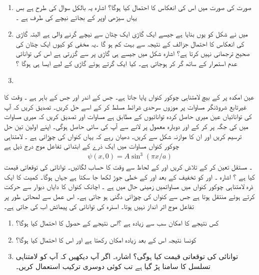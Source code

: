 \begin{enumerate}
\item  صورت   کی صورت میں اس کی انعکاس کا احتمال کیا ہوگا؟
 اشارہ یہ بالکل سوال  کی طرح ہے بس یہاں سیڑھی  اوپر کے بجائے نیچے کی طرف ہے ۔
\item 
 میں نے شکل کو یوں بنایا ہے جیسے ایک گاڑی ایک چٹان سے نیچے گرنے والی ہے البتہ گاڑی کی انعکاس کا احتمال جزالف کے نتیجہ سے بہت کم ہو گا ۔یہ مخفی کو کیوں ایک چٹان کی صحیح ترجمانی نہیں کرتا ہے؟
 اشارہ شکل میں جیسے ہی گاڑی  پر سے گزرتی ہے اس کی توانائی عدم استمرار کے ساتھ گر کر  ہوجاتی ہے۔ کیا ایک گرتے ہوئے گاڑی کے لیے ایسا ہی ہوگا ؟
\item
\end{enumerate}
عین امکدہ پر  کے بیچ لامتناہی چوکور کنواں پایا جاتا ہے۔ جس کے اندر اور جس کے باہر  ہے ۔ وقت کا  غیرتابع شروڈنگر مساوات پر موزوں سرحدی شرائط مسلط کر کے اسے حل کریں۔ تصدیق کریں کہ آپ کی توانائیاں عین  میری حاصل کردہ توانائیوں کے مطابق ہے مساوات اور تصدیق کریں کہ میری  مساوات میں  کی جگہ  پر کر کے اور دوبارہ معمول پر لانے سے آپ کی سائی حاصل ہوگی۔ اپنے اولین تین حل ترسیم کریں اور ان کا موازنہ شکل  سے کریں۔  دھیان رہے کہ یہاں کنواں کی چوڑائی   ہے ۔ 
 لامتناہی چوکور کنواں مساوات  میں ایک ذرے کے ابتدائی تفاعل موج درج ذیل ہے\begin{align} \psi(x,0)=A\sin^{3}(\pi x/a)\end{align}۔ 
 مستقل   تعین کر کے تلاش کریں  اور  کے لحاظ سے وقت  کا حساب لگائیں۔ توانائی کی توقعاتی قیمت کیا ہے ؟
 اشارہ ۔ اور 
 کو تخفیف کے بعد  اور کے خطی جوڑ  لکھا جا سکتا ہے جہاں   ہوگا۔
 کمیت کا ایک ذرہ لامتناہی چوکور کنواں میں مساواتمیں زمینی حال میں ہے ۔ اچانک کنواں کا دایاں دیوار  سے حرکت کرتے ہوئے   منتقل ہوتا ہے جس سے کنواں کی چوڑائی دگنی ہو جاتی ہے۔ اس عمل سے لمحاتی طور پر تفاعل موج اثر انداز نہیں ہوتا۔ اسذرہ کی توانائی کی پیمائش اب کی جاتی ہے۔
\begin{enumerate}
\item کس نتیجے کا امکان سب سے زیادہ ہے ؟اس نتیجے کے حصول کا احتمال کیا ہوگا؟ 
\item کونسا نتیجہ اس کے بعد زیادہ امکان رکھتا ہے اور اس کا احتمال کیا ہوگا؟
\item 
توانائی کی توقعاتی قیمت کیا ہوگی؟ اشارہ۔ اگر آپ دیکھیں کہ آپ کو لامتناہی تسلسل کا سامنا پڑ گیا ہے تب کوئی دوسری ترکیب استعمال کریں۔
\end{enumerate} 
